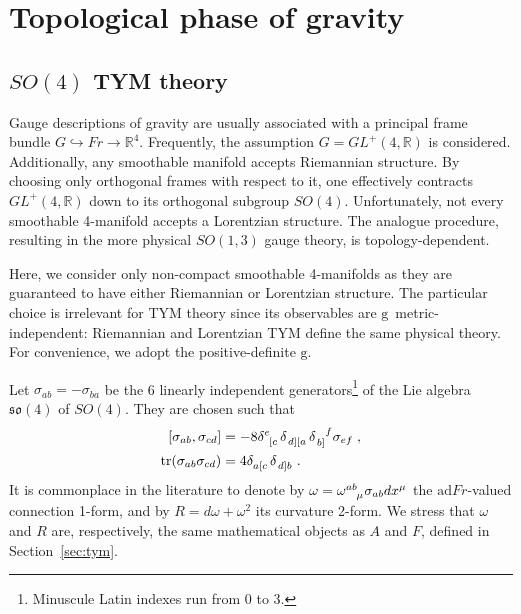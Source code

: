 \documentclass[../main.tex]{subfiles}
\begin{document}
\section{Topological phase of gravity}%
\label{sec:top_grav}

\subsection{\texorpdfstring{$SO(4)$}{SO\@(4)} TYM theory}%
\label{ssec:so4tym;sec:top_grav}

Gauge descriptions of gravity are usually associated with a principal frame bundle $G \hookrightarrow Fr \rightarrow \mathbb{R}^4 $. Frequently, the assumption $G = GL^{+}\left( 4, \mathbb{R} \right)$ is considered. Additionally, any smoothable manifold accepts Riemannian structure. By choosing only orthogonal frames with respect to it, one effectively contracts $GL^{+} \left( 4,\mathbb{R} \right)$ down to its orthogonal subgroup $SO \left( 4 \right)$. Unfortunately, not every smoothable 4-manifold accepts a Lorentzian structure. The analogue procedure, resulting in the more physical $SO \left( 1,3 \right)$ gauge theory, is topology-dependent.

Here, we consider only non-compact smoothable 4-manifolds as they are guaranteed to have either Riemannian or Lorentzian structure. The particular choice is irrelevant for TYM theory since its observables are $ \mathrm{g} $~metric-independent: Riemannian and Lorentzian TYM define the same physical theory. For convenience, we adopt the positive-definite $ \mathrm{g} $.

Let $\sigma_{ab}=-\sigma_{ba}$ be the 6 linearly independent generators\footnote{Minuscule Latin indexes run from 0 to 3.} of the Lie algebra $\mathfrak{so}\left( 4 \right)$ of $SO(4)$. They are chosen such that
\begin{subequations}%
  \label{eq:so4algebra}
  \begin{align}
    \left[ \sigma_{ab}, \sigma_{cd} \right] & =-8\tensor{\delta}{^{e}_{\left[ c \right.}}\tensor{\delta}{_{\left. d \right] \left[ a \right.}} \tensor{\delta}{_{\left. b \right]}^f} \sigma_{ef} \;, \\ %
    \tr (\sigma_{ab}\sigma_{cd})            & = 4 \tensor{\delta}{_{ a \left[ c \right. }} \tensor{\delta}{_{ \left. d \right] b }} \;.                                                               %
  \end{align}
\end{subequations}
It is commonplace in the literature to denote by $\omega=\tensor{\omega}{^{ab}_\mu} \sigma_{ab}dx^\mu$ the $\mathrm{ad} Fr $-valued connection 1-form, and by $R=d \omega + \omega^2$ its curvature 2-form. We stress that $ \omega $ and $ R $ are, respectively, the same mathematical objects as $A$ and $F$, defined in Section~\ref{sec:tym}.
\end{document}
